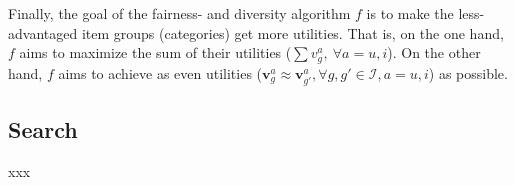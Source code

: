 Finally, the goal of the fairness- and diversity algorithm $f$ is to make the less-advantaged item groups (\eg categories) get more utilities. 
That is, on the one hand, $f$ aims to maximize the sum of their utilities (\ie $\sum v_g^a,~\forall a=u,i$). On the other hand, $f$ aims to achieve as even utilities ($\bm{v}_g^a \approx \bm{v}_{g'}^a, \forall g,g'\in\mathcal{I}, a=u,i$) as possible. 





\subsection{Search}
xxx